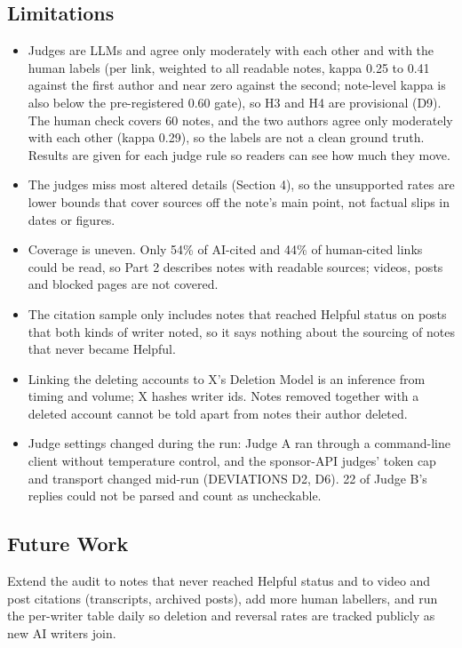 \documentclass[10.5pt]{article}
\begin{document}
\subsection*{Limitations}
\begin{itemize}
\item Judges are LLMs and agree only moderately with each other and with the human labels (per link, weighted to all readable notes, kappa 0.25 to 0.41 against the first author and near zero against the second; note-level kappa is also below the pre-registered 0.60 gate), so H3 and H4 are provisional (D9). The human check covers 60 notes, and the two authors agree only moderately with each other (kappa 0.29), so the labels are not a clean ground truth. Results are given for each judge rule so readers can see how much they move.
\item The judges miss most altered details (Section 4), so the unsupported rates are lower bounds that cover sources off the note's main point, not factual slips in dates or figures.
\item Coverage is uneven. Only 54\% of AI-cited and 44\% of human-cited links could be read, so Part 2 describes notes with readable sources; videos, posts and blocked pages are not covered.
\item The citation sample only includes notes that reached Helpful status on posts that both kinds of writer noted, so it says nothing about the sourcing of notes that never became Helpful.
\item Linking the deleting accounts to X's Deletion Model is an inference from timing and volume; X hashes writer ids. Notes removed together with a deleted account cannot be told apart from notes their author deleted.
\item Judge settings changed during the run: Judge A ran through a command-line client without temperature control, and the sponsor-API judges' token cap and transport changed mid-run (DEVIATIONS D2, D6). 22 of Judge B's replies could not be parsed and count as uncheckable.
\end{itemize}
\subsection*{Future Work}
Extend the audit to notes that never reached Helpful status and to video and post citations (transcripts, archived posts), add more human labellers, and run the per-writer table daily so deletion and reversal rates are tracked publicly as new AI writers join.
\end{document}
